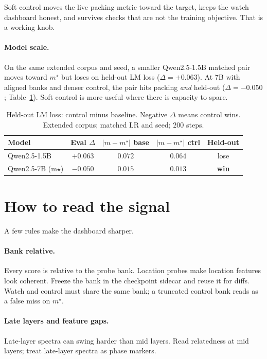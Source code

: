 \documentclass[11pt]{article}
\begin{document}
Soft control moves the live packing metric toward the target, keeps the watch
dashboard honest, and survives checks that are not the training objective.
That is a working knob.

\paragraph{Model scale.}
On the same extended corpus and seed, a smaller Qwen2.5-1.5B matched pair moves
toward $m^\star$ but loses on held-out LM loss ($\Delta{=}{+}0.063$). At 7B with
aligned banks and denser control, the pair hits packing \emph{and} held-out
($\Delta{=}{-}0.050$; Table~\ref{tab:scale}). Soft control is more useful where
there is capacity to spare.

\begin{table}[H]
  \centering
  \caption{Held-out LM loss: control minus baseline. Negative $\Delta$ means
  control wins. Extended corpus; matched LR and seed; $200$ steps.}
  \label{tab:scale}
  \setlength{\tabcolsep}{5pt}
  \begin{tabular}{@{}lcccc@{}}
    \toprule
    Model & Eval $\Delta$ & $|m{-}m^\star|$ base & $|m{-}m^\star|$ ctrl & Held-out \\
    \midrule
    Qwen2.5-1.5B & $+0.063$ & $0.072$ & $0.064$ & lose \\
    Qwen2.5-7B (m$\star$) & $-0.050$ & $0.015$ & $0.013$ & \textbf{win} \\
    \bottomrule
  \end{tabular}
\end{table}
\FloatBarrier

\section{How to read the signal}
\label{sec:limits}

A few rules make the dashboard sharper.

\paragraph{Bank relative.}
Every score is relative to the probe bank. Location probes make location
features look coherent. Freeze the bank in the checkpoint sidecar and reuse it
for diffs. Watch and control must share the same bank; a truncated control bank
reads as a false miss on $m^\star$.

\paragraph{Late layers and feature gaps.}
Late-layer spectra can swing harder than mid layers. Read relatedness at mid
layers; treat late-layer spectra as phase markers.
\end{document}

